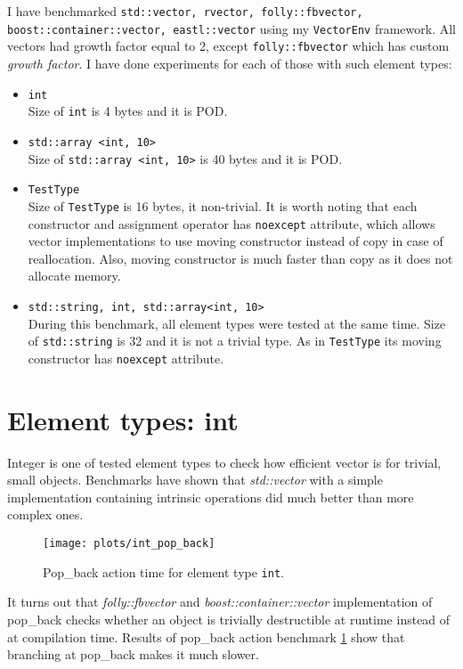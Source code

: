 \documentclass[inz, english, shortabstract]{iithesis}
\begin{document}
I have benchmarked {\tt std::vector, rvector, folly::fbvector, boost::container::vector, eastl::vector} using my {\tt VectorEnv} framework. All vectors had growth factor equal to 2, except {\tt folly::fbvector} which has custom \emph{growth factor}. I have done experiments for each of those with such element types:
\begin{itemize}
\item \lstinline{int}
\\
Size of \lstinline{int} is 4 bytes and it is POD.
\item \lstinline{std::array <int, 10>}
\\
Size of \lstinline{std::array <int, 10>} is 40 bytes and it is POD.
\item \lstinline{TestType}
\\
Size of \lstinline{TestType} is 16 bytes, it non-trivial. It is worth noting that each constructor and assignment operator has {\tt noexcept} attribute, which allows vector implementations to use moving constructor instead of copy in case of reallocation. Also, moving constructor is much faster than copy as it does not allocate memory.
\item \lstinline{std::string, int, std::array<int, 10>}
\\
During this benchmark, all element types were tested at the same time. Size of \lstinline{std::string} is 32 and it is not a trivial type. As in \lstinline{TestType} its moving constructor has {\tt noexcept} attribute.
\end{itemize}

\section{Element types: int}
Integer is one of tested element types to check how efficient vector is for trivial, small objects. Benchmarks have shown that {\it std::vector} with a simple implementation containing intrinsic operations did much better than more complex ones. 

\begin{figure}[h!]
\texttt{[image: plots/int\_pop\_back]}
\caption{Pop\_back action time for element type \lstinline{int}.}
\label{int_pop_back}
\end{figure}

It turns out that {\it folly::fbvector} and {\it boost::container::vector} implementation of pop\_back checks whether an object is trivially destructible at runtime instead of at compilation time. Results of pop\_back action benchmark \ref{int_pop_back} show that branching at pop\_back makes it much slower.
\end{document}
